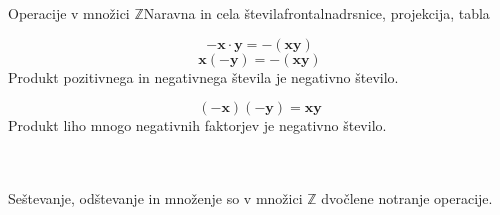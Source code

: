 \begin{priprava}{4}{}{Operacije v množici $\mathbb{Z}$}{Naravna in cela števila}{frontalna}{drsnice, projekcija, tabla}
\begin{multicols}{2}
     
        $$\mathbf{-x\cdot y=-(xy)}$$
        $$\mathbf{x(-y)=-(xy)}$$
        Produkt pozitivnega in negativnega števila je negativno število.
     

     
        $$\mathbf{(-x)(-y)=xy}$$
        Produkt liho mnogo negativnih faktorjev je negativno število.
        ~\newline ~\\~\\
    \end{multicols}

    ~\\
        Seštevanje, odštevanje in množenje so v množici $\mathbb{Z}$ dvočlene notranje operacije.
     
 

\end{priprava}